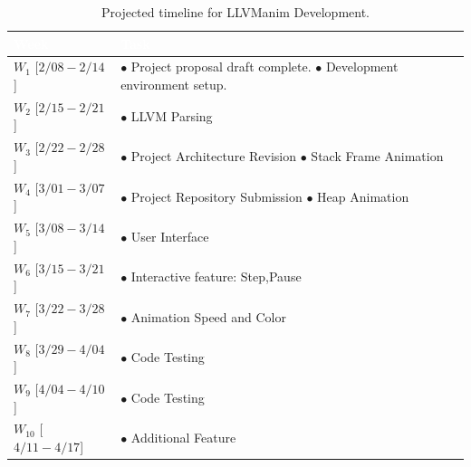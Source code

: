 
\begin{table}[htbp]
\centering
\renewcommand{\arraystretch}{1.5}
\begin{tabularx}{\columnwidth}{|>{\centering\arraybackslash}m{2.5cm}|>{\raggedright\arraybackslash}X|}
\hline
\rowcolor[HTML]{4472C4}
\textcolor{white}{\textbf{Week}} & \textcolor{white}{\textbf{Task}} \\ \hline
$W_1$    [$2/08 - 2/14$] & $\bullet$ Project proposal draft complete.\newline
                           $\bullet$ Development environment setup. \\ \hline
$W_2$    [$2/15 - 2/21$] & $\bullet$ LLVM Parsing \\ \hline
$W_3$    [$2/22 - 2/28$] & $\bullet$ Project Architecture Revision\newline
                           $\bullet$ Stack Frame Animation \\ \hline
$W_4$    [$3/01 - 3/07$] & $\bullet$ Project Repository Submission\newline
                           $\bullet$ Heap Animation \\ \hline
$W_5$    [$3/08 - 3/14$] & $\bullet$ User Interface\\ \hline
$W_6$    [$3/15 - 3/21$] & $\bullet$ Interactive feature: Step,Pause \\ \hline
$W_7$    [$3/22 - 3/28$] & $\bullet$ Animation Speed and Color \\ \hline
$W_8$    [$3/29 - 4/04$] & $\bullet$ Code Testing \\ \hline
$W_9$    [$4/04 - 4/10$] & $\bullet$ Code Testing\\ \hline
$W_{10}$ [$4/11 - 4/17$] & $\bullet$ Additional Feature\\ \hline
\end{tabularx}
\vspace{0.1cm}
\caption{Projected timeline for LLVManim Development.}
\end{table}
